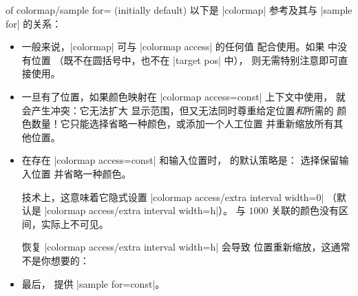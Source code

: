 {\begin{enumerate}
\begin{pgfplotskey}{of colormap/sample for= (initially default)}
            以下是 |colormap| 参考及其与 |sample for| 的关系：
            \begin{itemize}
                \item 一般来说，|colormap| 可与 |colormap access| 的任何值
                    配合使用。如果  中没有位置
                    （既不在圆括号中，也不在 |target pos| 中），
                    则无需特别注意即可直接使用。
\begin{codeexample}[]
\pgfplotscolorbardrawstandalone[
    colormap={example}{
        samples of colormap={
            5 of viridis,
        },
    },
    colorbar horizontal,
    colormap access=const]
\end{codeexample}
                \item 一旦有了位置，如果颜色映射在 |colormap access=const|
                    上下文中使用，\PGFPlots{} 就会产生冲突：它无法扩大
                    显示范围，但又无法同时尊重给定位置\emph{和}所需的
                    颜色数量！它只能选择省略一种颜色，或添加一个人工位置
                    并重新缩放所有其他位置。
                \item 在存在 |colormap access=const| 和输入位置时，
                    \PGFPlots{} 的默认策略是：\PGFPlots{} 选择保留输入位置
                    并省略一种颜色。
\begin{codeexample}[]
\pgfplotscolorbardrawstandalone[
    colormap={example}{
        of colormap={
            viridis,
            target pos={0,500,850,950,1000},
        },
    },
    colorbar horizontal,
    colormap access=const]
\end{codeexample}

                    技术上，这意味着它隐式设置
                    |colormap access/extra interval width=0|
                    （默认是 |colormap access/extra interval width=h|）。
                    与 $1000$ 关联的颜色没有区间，实际上不可见。

                    恢复 |colormap access/extra interval width=h| 会导致
                    位置重新缩放，这通常不是你想要的：
\begin{codeexample}[]
\pgfplotscolorbardrawstandalone[
    colormap={example}{
        samples of colormap={
            5 of viridis,
            target pos={0,500,850,950,1000},
        },
    },
    colormap access/extra interval width=h,
    colorbar horizontal,
    colormap access=const]
\end{codeexample}
                \item 最后，\PGFPlots{} 提供 |sample for=const|。


\end{itemize}
\end{pgfplotskey}
\end{enumerate}}

